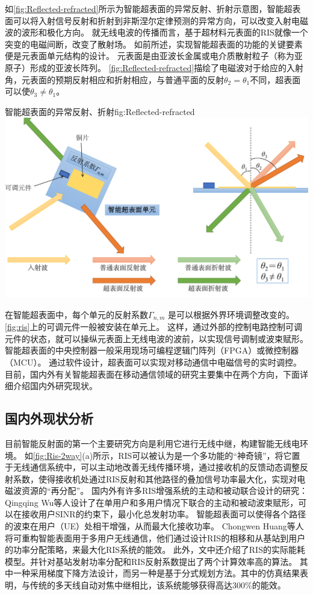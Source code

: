 \documentclass[supercite]{HustGraduPaper}
\begin{document}
如\autoref{fig:Reflected-refracted}所示为智能超表面的异常反射、折射示意图，智能超表面可以将入射信号反射和折射到非斯涅尔定律预测的异常方向，可以改变入射电磁波的波形和极化方向\cite{Renzo2019}。
就无线电波的传播而言，基于超材料元表面的RIS就像一个突变的电磁间断，改变了散射场。
如前所述，实现智能超表面的功能的关键要素便是元表面单元结构的设计。
元表面是由亚波长金属或电介质散射粒子（称为亚原子）形成的亚波长阵列\cite{basar2019wireless}。
\autoref{fig:Reflected-refracted}描绘了电磁波对于给应的入射角，元表面的预期反射相应和折射相应，与普通平面的反射$ \theta_2 =  \theta_1 $不同，超表面可以使$ \theta_3 \ne \theta_1 $。

\begin{generalfig}[htb]{智能超表面的异常反射、折射}{fig:Reflected-refracted}
	\includegraphics[width=0.8\linewidth]{Figures/Reflected-refracted.pdf}
\end{generalfig}

在智能超表面中，每个单元的反射系数$ \Gamma _ {n,m} $ 是可以根据外界环境调整改变的。
\autoref{fig:ris}上的可调元件一般被安装在单元上。
这样，通过外部的控制电路控制可调元件的状态，就可以操纵元表面上无线电波的波前，以实现信号调制或波束赋形。
智能超表面的中央控制器一般采用现场可编程逻辑门阵列（FPGA）或微控制器（MCU）。
通过软件设计，超表面可以实现对移动通信中电磁信号的实时调控。目前，国内外有关智能超表面在移动通信领域的研究主要集中在两个方向\cite{CHN_zhou2020}，下面详细介绍国内外研究现状。

\subsection{国内外现状分析}


目前智能反射面的第一个主要研究方向是利用它进行无线中继，构建智能无线电环境。
如\autoref{fig:Ris-2way}(a)所示，RIS可以被认为是一个多功能的“神奇镜”，将它置于无线通信系统中，可以主动地改善无线传播环境，通过接收机的反馈动态调整反射系数，使得接收机处通过RIS反射和其他路径的叠加信号功率最大化，实现对电磁波资源的“再分配”。
国内外有许多RIS增强系统的主动和被动联合设计的研究：Qingqing Wu等人设计了在单用户和多用户情况下联合的主动和被动波束赋形，可以在接收用户SINR的约束下，最小化总发射功率\cite{Wu2019}。
智能超表面可以使得各个路径的波束在用户（UE）处相干增强，从而最大化接收功率。
Chongwen Huang等人将可重构智能表面用于多用户无线通信，他们通过设计RIS的相移和从基站到用户的功率分配策略，来最大化RIS系统的能效。
此外，文中还介绍了RIS的实际能耗模型。并针对基站发射功率分配和RIS反射系数提出了两个计算效率高的算法。
其中一种采用梯度下降方法设计，而另一种是基于分式规划方法。其中的仿真结果表明，与传统的多天线自动对焦中继相比，该系统能够获得高达300\%的能效\cite{Huang2018a}。
\end{document}
